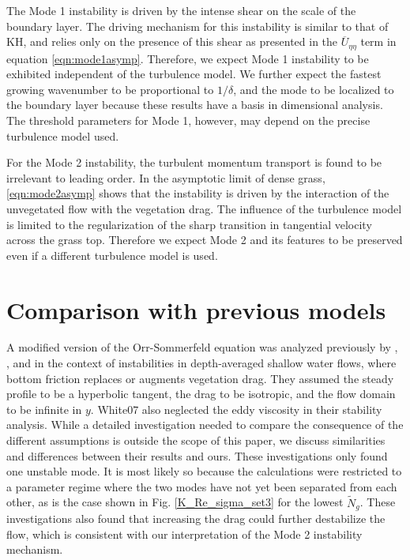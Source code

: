\documentclass[12pt]{report}   %
\newcommand{\Ndg}{\tilde{N}_g}
\renewcommand{\bar}{\overline}
\begin{document}
The Mode 1 instability is driven by the intense shear on the scale of the boundary layer.
The driving mechanism for this instability is similar to that of KH, and relies only on the presence of this shear as presented in the $\bar{U}_{\eta\eta}$ term in equation \eqref{eqn:mode1asymp}. 
Therefore, we expect Mode 1 instability to be exhibited independent of the turbulence model. 
We further expect the fastest growing wavenumber to be proportional to $1/\delta$, and the mode to be localized to the boundary layer because these results have a basis in dimensional analysis.
The threshold parameters for Mode 1, however, may depend on the precise turbulence model used.
 
For the Mode 2 instability, the turbulent momentum transport is found to be irrelevant to leading order.
In the asymptotic limit of dense grass, \eqref{eqn:mode2asymp} shows that the instability is driven by the interaction of the unvegetated flow with the vegetation drag.
The influence of the turbulence model is limited to the regularization of the sharp transition in tangential velocity across the grass top.
Therefore we expect Mode 2 and its features to be preserved even if a different turbulence model is used.
\section{Comparison with previous models}

A modified version of the Orr-Sommerfeld equation was analyzed previously by \cite{Chu91}, \cite{Chen97}, and \cite{White07} in the context of instabilities in depth-averaged shallow water flows, where bottom friction replaces or augments vegetation drag.
They assumed the steady profile to be a hyperbolic tangent, the drag to be isotropic, and the flow domain to be infinite in $y$.
{White07} also neglected the eddy viscosity in their stability analysis.
While a detailed investigation needed to compare the consequence of the different assumptions is outside the scope of this paper, we discuss similarities and differences between their results and ours.
These investigations only found one unstable mode.
It is most likely so because the calculations were restricted to a parameter regime where the two modes have not yet been separated from each other, as is the case shown in Fig. \ref{K_Re_sigma_set3} for the lowest $\Ndg$.
These investigations also found that increasing the drag could further destabilize the flow, which is consistent with our interpretation of the Mode 2 instability mechanism.
\end{document}
